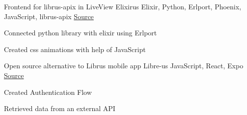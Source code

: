 \begin{cventries}

  \cventry
    {Frontend for librus-apix in LiveView} %
    {Elixirus} %
    {Elixir, Python, Erlport, Phoenix, JavaScript, librus-apix} %
    {\href{https://github.com/rustysnek/elixirus}{\faGithubSquare\acvHeaderIconSep Source}} %
    {
      \begin{cvitems} %
        \item {Connected python library with elixir using Erlport}
        \item {Created css animations with help of JavaScript}
      \end{cvitems}
    } %


  \cventry
    {Open source alternative to Librus mobile app} %
    {Libre-us} %
    {JavaScript, React, Expo} %
    {\href{https://github.com/rustysnek/libre-us}{\faGithubSquare\acvHeaderIconSep Source}} %
    {
      \begin{cvitems} %
        \item {Created Authentication Flow}
        \item {Retrieved data from an external API}
      \end{cvitems}
    } %


\end{cventries}
